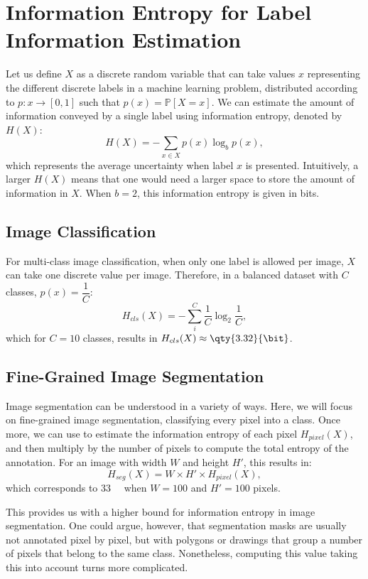 \section{Information Entropy for Label Information Estimation}

Let us define $X$ as a discrete random variable that can take values $x$ representing the different discrete labels in a machine learning problem, distributed according to $p: x\rightarrow [0, 1]$ such that $p(x)=\mathbb{P}[X=x]$. We can estimate the amount of information conveyed by a single label using information entropy, denoted by $H(X)$:
\begin{equation}
    H(X)=-\sum_{x\in X} p(x)\log_b p(x),
    \label{eq:entropy}
\end{equation}
which represents the average uncertainty when label $x$ is presented. Intuitively, a larger $H(X)$ means that one would need a larger space to store the amount of information in $X$. When $b=2$, this information entropy is given in bits.

\subsection{Image Classification}
For multi-class image classification, when only one label is allowed per image, $X$ can take one discrete value per image. Therefore, in a balanced dataset with $C$ classes, $p(x)=\dfrac{1}{C}$:
\[
H_{cls}(X) = - \sum_i^C \dfrac{1}{C}\log_2\dfrac{1}{C},
\]
which for $C=10$ classes, results in $H_{cls}(X)\approx \qty{3.32}{\bit}$.

\subsection{Fine-Grained Image Segmentation}
Image segmentation can be understood in a variety of ways. Here, we will focus on fine-grained image segmentation, \ie classifying every pixel into a class. Once more, we can use  to estimate the information entropy of each pixel $H_{pixel}(X)$, and then multiply by the number of pixels to compute the total entropy of the annotation. For an image with width $W$ and height $H'$, this results in:
\begin{equation}
    H_{seg}(X) = W\times H' \times H_{pixel}(X),
    \label{eq:seg_entropy}
\end{equation}
which corresponds to \qty{33}{\kilo\bit} when $W=100$ and $H'=100$ pixels.

This provides us with a higher bound for information entropy in image segmentation. One could argue, however, that segmentation masks are usually not annotated pixel by pixel, but with polygons or drawings that group a number of pixels that belong to the same class. Nonetheless, computing this value taking this into account turns more complicated.

